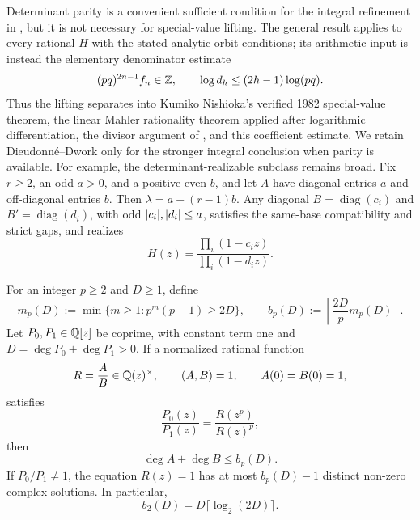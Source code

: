 \begin{remark}
Determinant parity is a convenient sufficient condition for the integral
refinement in , but it is not necessary
for special-value lifting.  The general result
 applies to every rational \(H\)
with the stated analytic orbit conditions; its arithmetic input is instead
the elementary denominator estimate
\[
 (pq)^{2n-1}f_n\in\mathbb{Z},\qquad
 \log d_h\le(2h-1)\log(pq).
\]
Thus the lifting separates into Kumiko Nishioka's verified 1982 special-value
theorem, the linear Mahler rationality theorem applied after logarithmic
differentiation, the divisor argument of
, and this coefficient estimate.  We retain
Dieudonn\'e--Dwork only for the stronger integral conclusion when parity is
available.  For example, the determinant-realizable subclass remains broad.
Fix \(r\ge2\), an odd \(a>0\), and a positive even \(b\), and let \(A\) have
diagonal entries \(a\) and off-diagonal entries \(b\).  Then
\(\lambda=a+(r-1)b\).  Any diagonal \(B=\operatorname{diag}(c_i)\) and
\(B'=\operatorname{diag}(d_i)\), with odd
\(\lvert c_i \rvert,\lvert d_i \rvert\le a\), satisfies the same-base compatibility and
strict gaps, and realizes
\[
 H(z)=\frac{\prod_i(1-c_i z)}{\prod_i(1-d_i z)}.
\]
\end{remark}

\begin{proposition}
\label{prop:logarithmic-mahler-divisor-bound}
For an integer \(p\ge2\) and \(D\ge1\), define
\begin{equation}\label{eq:logarithmic-mahler-bound-definition}
 m_p(D):=\min\{m\ge1:p^m(p-1)\ge2D\},
 \qquad
 b_p(D):=\left\lceil\frac{2D}{p}m_p(D)\right\rceil.
\end{equation}
Let \(P_0,P_1\in\mathbb{Q}[z]\) be coprime, with constant term one and
\(D=\deg P_0+\deg P_1>0\).  If a normalized rational function
\[
 R=\frac AB\in\mathbb{Q}(z)^\times,
 \qquad (A,B)=1,\qquad A(0)=B(0)=1,
\]
satisfies
\begin{equation}\label{eq:p-mahler-coboundary}
 \frac{P_0(z)}{P_1(z)}=\frac{R(z^p)}{R(z)^p},
\end{equation}
then
\begin{equation}\label{eq:logarithmic-mahler-degree-bound}
 \deg A+\deg B\le b_p(D).
\end{equation}
If \(P_0/P_1\ne1\), the equation \(R(z)=1\) has at most
\(b_p(D)-1\) distinct non-zero complex solutions.  In particular,
\begin{equation}\label{eq:binary-logarithmic-mahler-degree-bound}
 b_2(D)=D\lceil\log_2(2D)\rceil.
\end{equation}
\end{proposition}

